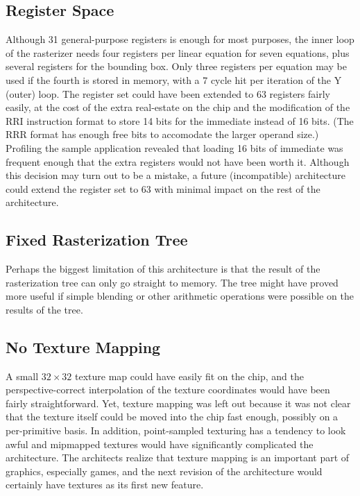 \documentclass{book}
\begin{document}
\subsection{Register Space}

Although 31 general-purpose registers is enough for most purposes, the
inner loop of the rasterizer needs four registers per linear equation
for seven equations, plus several registers for the bounding box.
Only three registers per equation may be used if the fourth is stored
in memory, with a 7 cycle hit per iteration of the Y (outer) loop.
The register set could have been extended to 63 registers fairly easily, at the
cost of the extra real-estate on the chip and the modification of the
RRI instruction format to store 14 bits for the immediate instead of
16 bits.  (The RRR format has enough free bits to accomodate the larger
operand size.)  Profiling the sample application revealed that loading
16 bits of immediate was frequent enough that the extra registers would
not have been worth it.  Although this decision may turn out to be a
mistake, a future (incompatible) architecture could extend the register
set to 63 with minimal impact on the rest of the architecture.

\subsection{Fixed Rasterization Tree}

Perhaps the biggest limitation of this architecture is that the result
of the rasterization tree can only go straight to memory.  The tree might
have proved more useful if simple blending or other arithmetic operations
were possible on the results of the tree.

\subsection{No Texture Mapping}

A small $32\times 32$ texture map could have easily fit on
the chip, and the perspective-correct interpolation of the texture
coordinates would have been fairly straightforward.  Yet, texture mapping
was left out because it was not clear that the texture itself could
be moved into the chip fast enough, possibly on a per-primitive basis.
In addition, point-sampled texturing has a tendency to look awful
and mipmapped textures would have significantly complicated the
architecture.  The architects realize that texture mapping is an
important part of graphics, especially games, and the next revision
of the architecture would certainly have textures as its first new
feature.
\end{document}
